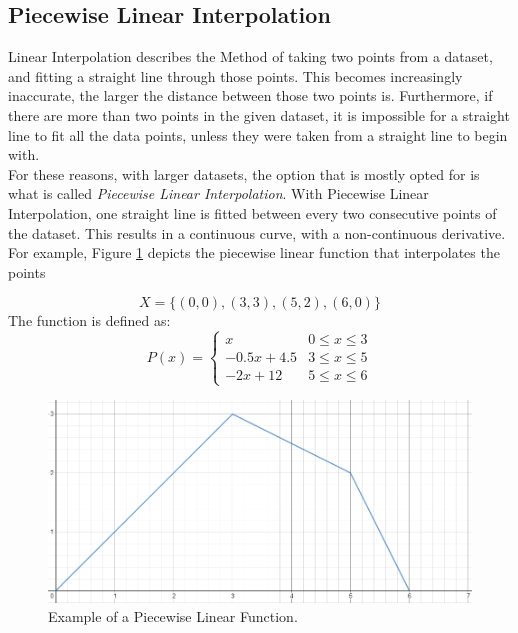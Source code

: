 \documentclass[a4paper,11pt, notitlepage]{article}
\begin{document}
\begin{onehalfspace}
\subsection{Piecewise Linear Interpolation}
\label{subsec:LinearInt}
Linear Interpolation describes the Method of taking two points from a dataset, and fitting a straight line through those points. This becomes increasingly inaccurate, the larger the distance between those two points is. Furthermore, if there are more than two points in the given dataset, it is impossible for a straight line to fit all the data points, unless they were taken from a straight line to begin with. \\
For these reasons, with larger datasets, the option that is mostly opted for is what is called \emph{Piecewise Linear Interpolation}. With Piecewise Linear Interpolation, one straight line is fitted between every two consecutive points of the dataset. This results in a continuous curve, with a non-continuous derivative.\\

For example, Figure \ref{fig:pw-linear-example} depicts the piecewise linear function that interpolates the points 


$$X = \{(0, 0), (3, 3), (5, 2), (6, 0)\}$$
The function is defined as:
\[
	P(x)=\begin{cases}
		x & 0 \leq x \leq 3 \\
		-0.5x+4.5 & 3 \leq x \leq 5 \\
		-2x+12 & 5 \leq x \leq 6
	\end{cases}
\]

\begin{figure}[H]
	\centering
	\includegraphics[width=\textwidth]{./images/pw-linear-example.png}
	\caption{Example of a Piecewise Linear Function.}
	\label{fig:pw-linear-example}
\end{figure}


\end{onehalfspace}
\end{document}
